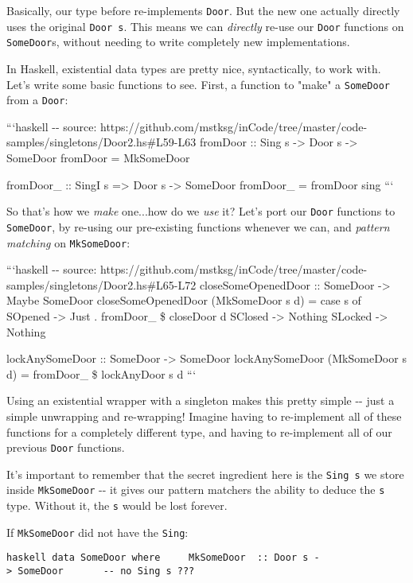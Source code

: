 \documentclass[]{article}
\begin{document}
Basically, our type before re-implements \texttt{Door}. But the new one actually
directly uses the original \texttt{Door\ s}. This means we can \emph{directly}
re-use our \texttt{Door} functions on \texttt{SomeDoor}s, without needing to
write completely new implementations.

In Haskell, existential data types are pretty nice, syntactically, to work with.
Let's write some basic functions to see. First, a function to "make" a
\texttt{SomeDoor} from a \texttt{Door}:

```haskell -\/- source:
https://github.com/mstksg/inCode/tree/master/code-samples/singletons/Door2.hs\#L59-L63
fromDoor :: Sing s -\textgreater{} Door s -\textgreater{} SomeDoor fromDoor =
MkSomeDoor

fromDoor\_ :: SingI s =\textgreater{} Door s -\textgreater{} SomeDoor fromDoor\_
= fromDoor sing ```

So that's how we \emph{make} one...how do we \emph{use} it? Let's port our
\texttt{Door} functions to \texttt{SomeDoor}, by re-using our pre-existing
functions whenever we can, and \emph{pattern matching} on \texttt{MkSomeDoor}:

```haskell -\/- source:
https://github.com/mstksg/inCode/tree/master/code-samples/singletons/Door2.hs\#L65-L72
closeSomeOpenedDoor :: SomeDoor -\textgreater{} Maybe SomeDoor
closeSomeOpenedDoor (MkSomeDoor s d) = case s of SOpened -\textgreater{} Just .
fromDoor\_ \$ closeDoor d SClosed -\textgreater{} Nothing SLocked
-\textgreater{} Nothing

lockAnySomeDoor :: SomeDoor -\textgreater{} SomeDoor lockAnySomeDoor (MkSomeDoor
s d) = fromDoor\_ \$ lockAnyDoor s d ```

Using an existential wrapper with a singleton makes this pretty simple -\/- just
a simple unwrapping and re-wrapping! Imagine having to re-implement all of these
functions for a completely different type, and having to re-implement all of our
previous \texttt{Door} functions.

It's important to remember that the secret ingredient here is the
\texttt{Sing\ s} we store inside \texttt{MkSomeDoor} -\/- it gives our pattern
matchers the ability to deduce the \texttt{s} type. Without it, the \texttt{s}
would be lost forever.

If \texttt{MkSomeDoor} did not have the \texttt{Sing}:

\texttt{haskell\ data\ SomeDoor\ where\ \ \ \ \ MkSomeDoor\ \ ::\ Door\ s\ -\textgreater{}\ SomeDoor\ \ \ \ \ \ \ -\/-\ no\ Sing\ s\ ???}
\end{document}
